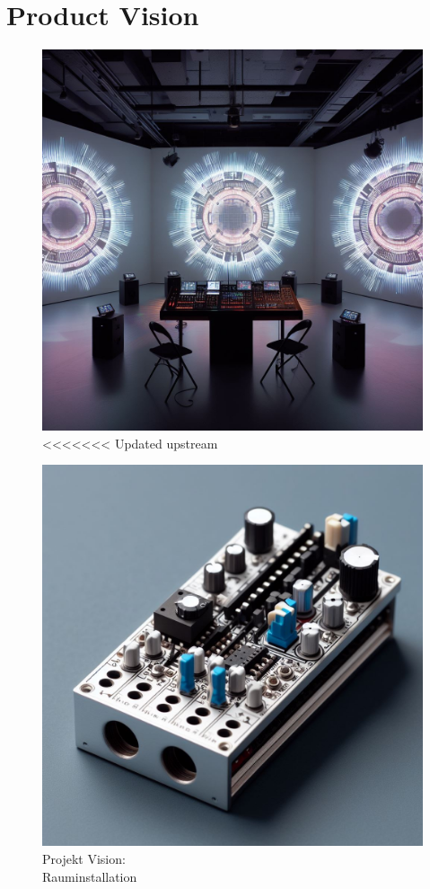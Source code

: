 \documentclass[12pt]{scrartcl}%
\theoremstyle{nonumberplain}
\begin{document}
\section{Product Vision}
\begin{figure}[h]
   \begin{minipage}[b]{.4\linewidth} %
      \includegraphics[width=\linewidth]{vision1}
<<<<<<< Updated upstream
      \caption{Projekt Vision:\\Rauminstallation}
   \end{minipage}
   \hspace{.1\linewidth}%
   \begin{minipage}[b]{.4\linewidth} %
      \includegraphics[width=\linewidth]{controller1}

\end{minipage}
\end{figure}
\end{document}
